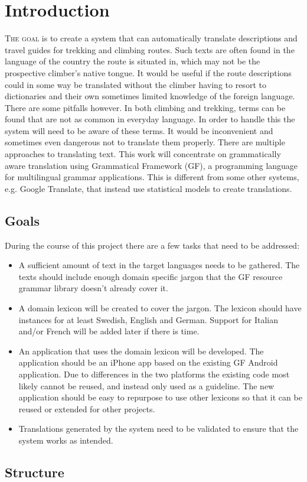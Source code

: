 \chapter{Introduction}
\lettrine[lines=4, loversize=-0.1, lraise=0.1]{T}{he goal} is to create a system that can automatically translate descriptions and travel guides for trekking and climbing routes. Such texts are often found in the language of the country the route is situated in, which may not be the prospective climber's native tongue. It would be useful if the route descriptions could in some way be translated without the climber having to resort to dictionaries and their own sometimes limited knowledge of the foreign language.
There are some pitfalls however. In both climbing and trekking, terms can be found that are not as common in everyday language. In order to handle this the system will need to be aware of these terms. It would be inconvenient and sometimes even dangerous not to translate them properly.
There are multiple approaches to translating text. This work will concentrate on grammatically aware translation using Grammatical Framework (GF), a programming language for multilingual grammar applications. This is different from some other systems, e.g. Google Translate, that instead use statistical models to create translations.

\section{Goals}
During the course of this project there are a few tasks that need to be addressed:
\begin{itemize}
\item A sufficient amount of text in the target languages needs to be gathered. The texts should include enough domain specific jargon that the GF resource grammar library doesn't already cover it.
\item A domain lexicon will be created to cover the jargon. The lexicon should have instances for at least Swedish, English and German. Support for Italian and/or French will be added later if there is time.
\item An application that uses the domain lexicon will be developed. The application should be an iPhone app based on the existing GF Android application. Due to differences in the two platforms the existing code most likely cannot be reused, and instead only used as a guideline. The new application should be easy to repurpose to use other lexicons so that it can be reused or extended for other projects.
\item Translations generated by the system need to be validated to ensure that the system works as intended.
\end{itemize}

\section{Structure}
